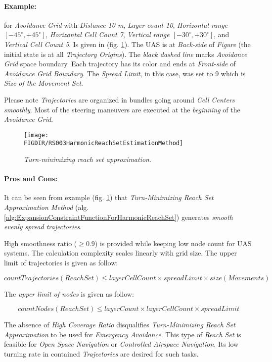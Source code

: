 \paragraph{Example:} for \emph{Avoidance Grid} with \emph{Distance 10 m}, \emph{Layer count 10}, \emph{Horizontal range $[-45^\circ,+45^\circ]$}, \emph{Horizontal Cell Count 7}, \emph{Vertical range $[-30^\circ,+30^\circ]$}, and \emph{Vertical Cell Count 5}. Is given in (fig. \ref{fig:harmonicReachSetApproximation}). The UAS is at \emph{Back-side} of \emph{Figure} (the initial state is at all \emph{Trajectory Origins}). The \emph{black dashed line} marks \emph{Avoidance Grid} space boundary. Each trajectory has its color and ends at \emph{Front-side} of \emph{Avoidance Grid Boundary}. The \emph{Spread Limit}, in this case, was set to $9$ which is \emph{Size of the Movement Set}.

\begin{note}
    Please note \emph{Trajectories} are organized in bundles going around \emph{Cell Centers smoothly}. Most of the steering maneuvers are executed at the \emph{beginning} of the \emph{Avoidance Grid}.
\end{note}

\begin{figure}[H]
    \centering
    \texttt{[image: \\FIGDIR/RS003HarmonicReachSetEstimationMethod]} 
    \caption{\emph{Turn-minimizing \emph{reach set} approximation}.}
    \label{fig:harmonicReachSetApproximation}
\end{figure}

\paragraph{Pros and Cons:} It can be seen from example (fig. \ref{fig:harmonicReachSetApproximation}) that \emph{Turn-Minimizing Reach Set Approximation Method} (alg. \ref{alg:ExpansionConstraintFunctionForHarmonicReachSet}) generates \emph{smooth evenly spread trajectories}.
    
High smoothness ratio ($\ge 0.9$) is provided while keeping low node count for UAS systems. The calculation complexity scales linearly with grid size. The upper limit of trajectories is given as follow:

\begin{equation}
    countTrajectories(ReachSet) \le layerCellCount \times spreadLimit \times size(Movements)
\end{equation}

\noindent The \emph{upper limit of nodes} is given as follow:

\begin{equation}
    countNodes(ReachSet) \le layerCount \times layerCellCount \times spreadLimit
\end{equation}

\noindent The absence of \emph{High Coverage Ratio} disqualifies \emph{Turn-Minimizing Reach Set Approximation} to be used for \emph{Emergency Avoidance}. This type of \emph{Reach Set} is feasible for \emph{Open Space Navigation} or \emph{Controlled Airspace Navigation}. Its low turning rate in contained \emph{Trajectories} are desired for such tasks. 



